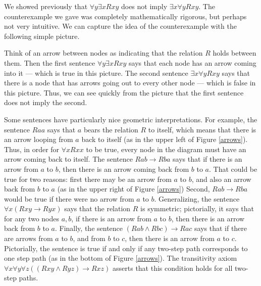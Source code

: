 We showed previously that $\forall y\exists xRxy$ does not imply
$\exists x\forall yRxy$.  The counterexample we gave was completely
mathematically rigorous, but perhaps not very intuitive.  We can
capture the idea of the counterexample with the following simple
picture.
\begin{figure}
  \centering
   \end{figure} Think of an arrow between nodes as
indicating that the relation $R$ holds between them.  Then the first
sentence $\forall y\exists xRxy$ says that each node has an arrow
coming into it --- which is true in this picture.  The second sentence
$\exists x\forall yRxy$ says that there is a node that has arrows
going out to every other node --- which is false in this picture.
Thus, we can see quickly from the picture that the first sentence does
not imply the second.


Some sentences have particularly nice geometric interpretations.  For
example, the sentence $Raa$ says that $a$ bears the relation $R$ to
itself, which means that there is an arrow looping from $a$ back to
itself (as in the upper left of Figure \ref{arrows}).  Thus, in order
for $\forall xRxx$ to be true, every node in the diagram must have an
arrow coming back to itself.  The sentence $Rab\to Rba$ says that if
there is an arrow from $a$ to $b$, then there is an arrow coming back
from $b$ to $a$.  That could be true for two reasons: first there may
be an arrow from $a$ to $b$, and also an arrow back from $b$ to $a$
(as in the upper right of Figure \ref{arrows}) Second, $Rab\to Rba$
would be true if there were no arrow from $a$ to $b$.  Generalizing,
the sentence $\forall x(Rxy\to Ryx)$ says that the relation $R$ is
symmetric; pictorially, it says that for any two nodes $a,b$, if there
is an arrow from $a$ to $b$, then there is an arrow back from $b$ to
$a$.  Finally, the sentence $(Rab\wedge Rbc)\to Rac$ says that if
there are arrows from $a$ to $b$, and from $b$ to $c$, then there is
an arrow from $a$ to $c$.  Pictorially, the sentence is true if and
only if any two-step path corresponds to one step path (as in the
bottom of Figure \ref{arrows}).  The transitivity axiom
$\forall x\forall y\forall z((Rxy\wedge Ryz)\to Rxz)$ asserts that
this condition holds for all two-step paths.

